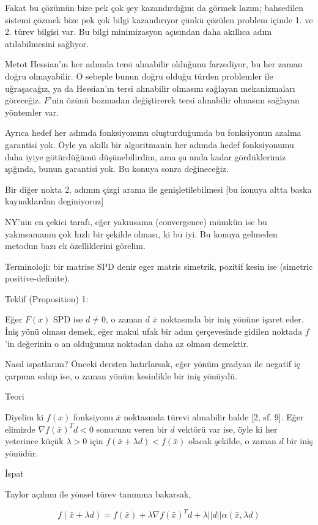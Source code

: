 \documentclass[12pt,fleqn]{article}\usepackage{../../common}
\begin{document}
Fakat bu çözümün bize pek çok şey kazandırdığını da görmek lazım;
bahsedilen sistemi çözmek bize pek çok bilgi kazandırıyor çünkü çözülen
problem içinde 1. ve 2. türev bilgisi var. Bu bilgi minimizasyon açısından
daha akıllıca adım atılabilmesini sağlıyor. 

Metot Hessian'ın her adımda tersi alınabilir olduğunu farzediyor, bu her
zaman doğru olmayabilir. O sebeple bunun doğru olduğu türden problemler ile
uğraşacağız, ya da Hessian'ın tersi alınabilir olmasını sağlayan
mekanizmaları göreceğiz. $F$'nin özünü bozmadan değiştirerek tersi
alınabilir olmasını sağlayan yöntemler var. 

Ayrıca hedef her adımda fonksiyonunu oluşturduğumda bu fonksiyonun azalma
garantisi yok. Öyle ya akıllı bir algoritmanin her adımda hedef
fonksiyonumu daha iyiye götürdüğümü düşünebilirdim, ama şu anda kadar
gördüklerimiz ışığında, bunun garantisi yok. Bu konuya sonra değineceğiz. 

Bir diğer nokta 2. adımın çizgi arama ile genişletilebilmesi [bu konuya
altta baska kaynaklardan deginiyoruz]

NY'nin en çekici tarafı, eğer yakınsama (convergence) mümkün ise bu
yakınsamanın çok hızlı bir şekilde olması, ki bu iyi. Bu konuya gelmeden
metodun bazı ek özelliklerini görelim.

Terminoloji: bir matrise SPD denir eger matris simetrik, pozitif kesin ise
(simetric positive-definite). 

Teklif (Proposition) 1: 

Eğer $F(x)$ SPD ise $d \ne 0$, o zaman $d$ $\bar{x}$ noktasında bir iniş
yönüne işaret eder. İniş yönü olması demek, eğer makul ufak bir adım
çerçevesinde gidilen noktada $f$'in değerinin o an olduğumuz noktadan daha
az olması demektir.

Nasıl ispatlarım? Önceki dersten hatırlarsak, eğer yönüm gradyan ile
negatif iç çarpıma sahip ise, o zaman yönüm kesinlikle bir iniş yönüydü.

Teori 

Diyelim ki $f(x)$ fonksiyonu $\bar{x}$ noktasında türevi alınabilir halde
[2, sf. 9]. Eğer elimizde $\nabla f(\bar{x})^T d < 0$ sonucunu veren bir
$d$ vektörü var ise, öyle ki her yeterince küçük $\lambda > 0$ için
$f(\bar{x}+\lambda d) < f(\bar{x})$ olacak şekilde, o zaman $d$ bir iniş
yönüdür.

İspat 

Taylor açılımı ile yönsel türev tanımına bakarsak,

$$
f(\bar{x} + \lambda d ) = 
f(\bar{x}) + \lambda \nabla f(\bar{x})^T d + 
\lambda ||d|| \alpha(\bar{x},\lambda d)
$$
\end{document}
